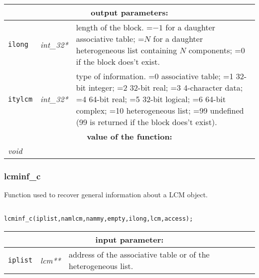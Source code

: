 \noindent
\begin{tabular}{|p{1.5cm}|p{2cm}|p{11cm}|}
\hline
\multicolumn{3}{|c|}{\bf output parameters:} \\
\hline
{\tt ilong} & {\it int\_32*} & length of the block. =$-1$ for a daughter associative table; 
                                    =$N$ for a daughter heterogeneous list containing $N$ components; 
		                 =0 if the block does't exist. \\
\hline
{\tt itylcm} & {\it int\_32*} & type of information. =0 associative table; =1 32-bit integer; 
                                    =2 32-bit real; =3 4-character data; 
				    =4 64-bit real; =5 32-bit logical; =6 64-bit complex; =10 heterogeneous list; 
				    =99 undefined (99 is returned if the block does't exist). \\
\hline
\multicolumn{3}{|c|}{\bf value of the function:} \\
\hline
\multicolumn{2}{|l|}{\it void} &  \\
\hline
\end{tabular}

\subsubsection{lcminf\_c}

Function used to recover general information about a LCM object.

\begin{verbatim}

lcminf_c(iplist,namlcm,nammy,empty,ilong,lcm,access);
\end{verbatim}

\noindent
\begin{tabular}{|p{1.5cm}|p{2cm}|p{11cm}|}
\hline
\multicolumn{3}{|c|}{\bf input parameter:} \\
\hline
{\tt iplist} & {\it lcm**} & address of the associative table or of the heterogeneous list. \\
\hline
\end{tabular}

\vskip 0.8cm


